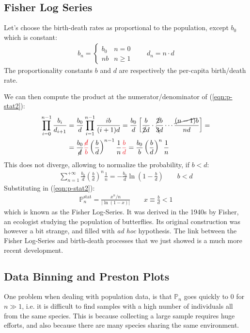 \documentclass[../../main.tex]{subfiles}
\begin{document}
\subsection{Fisher Log Series}
Let's choose the birth-death rates as proportional to the population, except $b_0$ which is constant:
\begin{align*}
    b_n = \begin{cases}
        b_0 & n = 0\\
        n b & n \geq 1
    \end{cases} \qquad d_n = n\cdot d
\end{align*}
The proportionality constants $b$ and $d$ are respectively the per-capita birth/death rate.

\medskip

We can then compute the product at the numerator/denominator of (\ref{eqn:p-stat2}):
\begin{align*}
    \prod_{i=0}^{n-1} \frac{b_i}{d_{i+1}} &= \frac{b_0}{d} \prod_{i=1}^{n-1} \frac{ib}{(i+1)d} = \frac{b_0}{d} \left[\frac{b}{\cancel{2}d} \cdot \frac{\cancel{2}b}{\bcancel{3}d} \cdots \frac{\cancel{(n-1)}b}{nd}   \right] =\\
    &= \frac{b_0}{\cancel{d}} \textcolor{Red}{\frac{\cancel{d}}{b}}  \left(\frac{b}{d} \right)^{n-1} \frac{1}{n} \textcolor{Red}{\frac{b}{d}}  = \frac{b_0}{b} \left(\frac{b}{d} \right)^n \frac{1}{n} 
\end{align*}
This does not diverge, allowing to normalize the probability, if $b < d$:
\begin{align*}
    \sum_{n=1}^{+\infty} \frac{b_0}{d} \left(\frac{b}{d} \right)^n \frac{1}{n} = - \frac{b_0}{d} \ln \left(1-\frac{b}{d} \right)  \qquad b < d
\end{align*}
Substituting in (\ref{eqn:p-stat2}):
\begin{align}\label{eqn:fisher-log}
    \mathbb{P}_n^{\mathrm{stat}} = \frac{x^n/n}{|\ln(1-x)|} \qquad x \equiv \frac{b}{d} < 1 
\end{align}
which is known as the Fisher Log-Series. It was derived in the 1940s by Fisher, an ecologist studying the population of butterflies. Its original construction was however a bit strange, and filled with \textit{ad hoc} hypothesis. The link between the Fisher Log-Series and birth-death processes that we just showed is a much more recent development. 

\subsection{Data Binning and Preston Plots}
One problem when dealing with population data, is that $\mathbb{P}_n$ goes quickly to $0$ for $n \gg 1$, i.e. it is difficult to find samples with a high number of individuals all from the same species. This is because collecting a large sample requires huge efforts, and also because there are many species sharing the same environment.
\end{document}
